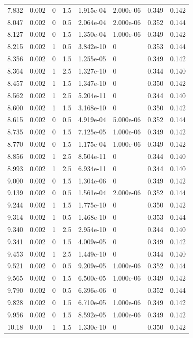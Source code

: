 \documentclass[preview]{standalone}
\begin{document}
{{{\begin{tabular}{L{1.2cm}C{1.2cm} C{0.3cm}C{0.5cm} C{1.4cm}C{1.4cm} C{1.4cm}C{1.4cm}}
  7.832  &  0.002  & 0     & 1.5 &  1.915e-04  & 2.000e-06  & 0.349 &  0.142   \\ 
  8.047  &  0.002  & 0     & 0.5 &  2.064e-04  & 2.000e-06  & 0.352 &  0.144   \\ 
  8.127  &  0.002  & 0     & 1.5 &  1.350e-04  & 1.000e-06  & 0.349 &  0.142   \\ 
  8.215  &  0.002  & 1     & 0.5 &  3.842e-10  & 0  & 0.353 &  0.144   \\ 
  8.356  &  0.002  & 0     & 1.5 &  1.255e-05  & 0  & 0.349 &  0.142   \\ 
  8.364  &  0.002  & 1     & 2.5 &  1.327e-10  & 0  & 0.344 &  0.140   \\ 
  8.457  &  0.002  & 1     & 1.5 &  1.347e-10  & 0  & 0.350 &  0.142   \\ 
  8.562  &  0.002  & 1     & 2.5 &  5.204e-11  & 0  & 0.344 &  0.140   \\ 
  8.600  &  0.002  & 1     & 1.5 &  3.168e-10  & 0  & 0.350 &  0.142   \\ 
  8.615  &  0.002  & 0     & 0.5 &  4.919e-04  & 5.000e-06  & 0.352 &  0.144   \\ 
  8.735  &  0.002  & 0     & 1.5 &  7.125e-05  & 1.000e-06  & 0.349 &  0.142   \\ 
  8.770  &  0.002  & 0     & 1.5 &  1.175e-04  & 1.000e-06  & 0.349 &  0.142   \\ 
  8.856  &  0.002  & 1     & 2.5 &  8.504e-11  & 0  & 0.344 &  0.140   \\ 
  8.993  &  0.002  & 1     & 2.5 &  6.934e-11  & 0  & 0.344 &  0.140   \\ 
  9.000  &  0.002  & 0     & 1.5 &  1.304e-06  & 0  & 0.349 &  0.142   \\ 
  9.139  &  0.002  & 0     & 0.5 &  1.561e-04  & 2.000e-06  & 0.352 &  0.144   \\ 
  9.244  &  0.002  & 1     & 1.5 &  1.775e-10  & 0  & 0.350 &  0.142   \\ 
  9.314  &  0.002  & 1     & 0.5 &  1.468e-10  & 0  & 0.353 &  0.144   \\ 
  9.340  &  0.002  & 1     & 2.5 &  2.954e-10  & 0  & 0.344 &  0.140   \\ 
  9.341  &  0.002  & 0     & 1.5 &  4.009e-05  & 0  & 0.349 &  0.142   \\ 
  9.453  &  0.002  & 1     & 2.5 &  1.449e-10  & 0  & 0.344 &  0.140   \\ 
  9.521  &  0.002  & 0     & 0.5 &  9.209e-05  & 1.000e-06  & 0.352 &  0.144   \\ 
  9.565  &  0.002  & 0     & 1.5 &  6.500e-05  & 1.000e-06  & 0.349 &  0.142   \\ 
  9.790  &  0.002  & 0     & 0.5 &  6.396e-06  & 0  & 0.352 &  0.144   \\ 
  9.828  &  0.002  & 0     & 1.5 &  6.710e-05  & 1.000e-06  & 0.349 &  0.142   \\ 
  9.956  &  0.002  & 0     & 1.5 &  8.592e-05  & 1.000e-06  & 0.349 &  0.142   \\ 
  10.18  &  0.00  & 1     & 1.5 &  1.330e-10  & 0  & 0.350 &  0.142   \\ 
\hline 
\end{tabular} 

}}}
\end{document}
